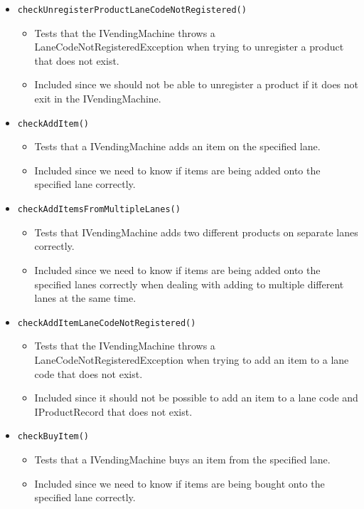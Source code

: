 \documentclass{article}
\begin{document}
\begin{itemize}
\item \verb+checkUnregisterProductLaneCodeNotRegistered()+
\begin{itemize}
\item Tests that the IVendingMachine throws a LaneCodeNotRegisteredException when trying to unregister a product that does not exist.
\item Included since we should not be able to unregister a product if it does not exit in the IVendingMachine.
\end{itemize}

\item \verb+checkAddItem()+
\begin{itemize}
\item Tests that a IVendingMachine adds an item on the specified lane.
\item Included since we need to know if items are being added onto the specified lane correctly.
\end{itemize}

\item \verb+checkAddItemsFromMultipleLanes()+
\begin{itemize}
\item Tests that IVendingMachine adds two different products on separate lanes correctly.
\item Included since we need to know if items are being added onto the specified lanes correctly when dealing with adding to multiple different lanes at the same time.
\end{itemize}

\item \verb+checkAddItemLaneCodeNotRegistered()+
\begin{itemize}
\item Tests that the IVendingMachine throws a LaneCodeNotRegisteredException when trying to add an item to a lane code that does not exist.
\item Included since it should not be possible to add an item to a lane code and IProductRecord that does not exist.
\end{itemize}

\item \verb+checkBuyItem()+
\begin{itemize}
\item Tests that a IVendingMachine buys an item from the specified lane.
\item Included since we need to know if items are being bought onto the specified lane correctly.
\end{itemize}


\end{itemize}
\end{document}

